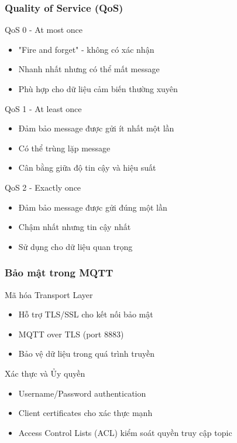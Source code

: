 \begin{frame}
\frametitle{Quality of Service (QoS)}

\begin{block}{QoS 0 - At most once}
\begin{itemize}
\item "Fire and forget" - không có xác nhận
\item Nhanh nhất nhưng có thể mất message
\item Phù hợp cho dữ liệu cảm biến thường xuyên
\end{itemize}
\end{block}

\begin{block}{QoS 1 - At least once}
\begin{itemize}
\item Đảm bảo message được gửi ít nhất một lần
\item Có thể trùng lặp message
\item Cân bằng giữa độ tin cậy và hiệu suất
\end{itemize}
\end{block}

\begin{block}{QoS 2 - Exactly once}
\begin{itemize}
\item Đảm bảo message được gửi đúng một lần
\item Chậm nhất nhưng tin cậy nhất
\item Sử dụng cho dữ liệu quan trọng
\end{itemize}
\end{block}

\end{frame}


\begin{frame}
\frametitle{Bảo mật trong MQTT}

\begin{block}{Mã hóa Transport Layer}
\begin{itemize}
\item Hỗ trợ TLS/SSL cho kết nối bảo mật
\item MQTT over TLS (port 8883)
\item Bảo vệ dữ liệu trong quá trình truyền
\end{itemize}
\end{block}

\begin{block}{Xác thực và Ủy quyền}
\begin{itemize}
\item Username/Password authentication
\item Client certificates cho xác thực mạnh
\item Access Control Lists (ACL) kiểm soát quyền truy cập topic
\end{itemize}
\end{block}
\end{frame}

